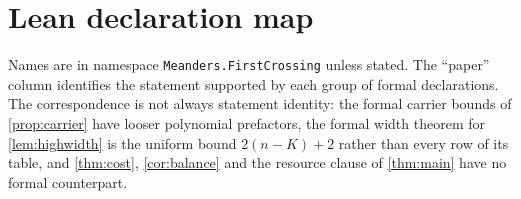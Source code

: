 \clearpage
\section{Lean declaration map}
\label{app:lean}

Names are in namespace \texttt{Meanders.FirstCrossing} unless stated. The
``paper'' column identifies the statement supported by each group of formal
declarations. The correspondence is not always statement identity: the formal carrier bounds of
\cref{prop:carrier} have looser polynomial prefactors, the formal width
theorem for \cref{lem:highwidth} is the uniform bound $2(n-K)+2$ rather than
every row of its table, and \cref{thm:cost}, \cref{cor:balance} and the
resource clause of \cref{thm:main} have no formal counterpart.

\begingroup
\small
\setlength{\tabcolsep}{0pt}
\medskip
\noindent
